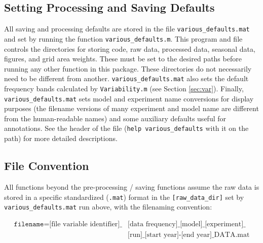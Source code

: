 \documentclass{article}
\begin{document}
\subsection{Setting Processing and Saving Defaults}\label{func:various_defaults.m}
All saving and processing defaults are stored in the file \texttt{various\_defaults.mat} and set by running the function \texttt{various\_defaults.m}. This program and file controls the directories for storing code, raw data, processed data, seasonal data, figures, and grid area weights. These must be set to the desired paths before running any other function in this package. These directories do not necessarily need to be different from another. \texttt{various\_defaults.mat} also sets the default frequency bands calculated by \texttt{Variability.m} (see Section \ref{sec:var}). Finally, \texttt{various\_defaults.mat} sets model and experiment name conversions for display purposes (the filename versions of many experiment and model name are different from the human-readable names) and some auxiliary defaults useful for annotations. See the header of the file (\texttt{help various\_defaults} with it on the path) for more detailed descriptions.

\subsection{File Convention}
All functions beyond the pre-processing / saving functions assume the raw data is stored in a specific standardized (\texttt{.mat}) format in the \texttt{[raw\_data\_dir]} set by \texttt{various\_defaults.mat} run above, with the filenaming convention: 

\begin{equation}
\begin{split}
\texttt{filename} = \text{[file variable identifier]\_}&\text{[data frequency]\_[model]\_[experiment]\_}\\
&\text{[run]\_[start year]-[end year]\_DATA.mat}
\end{split}
\end{equation}
\end{document}
